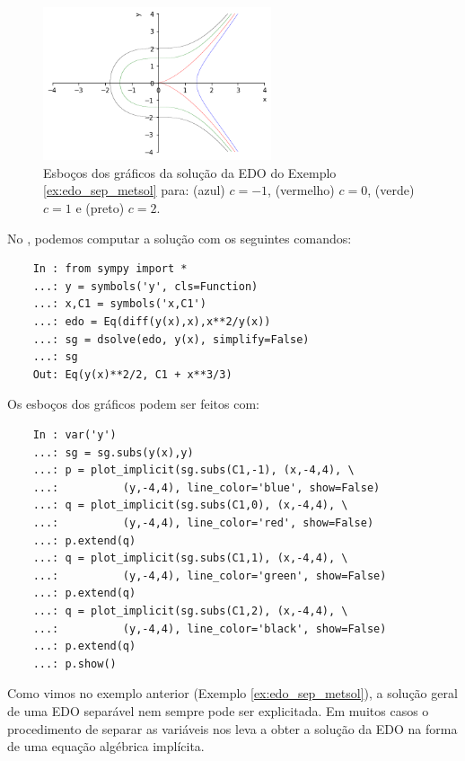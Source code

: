 \begin{ex}
  \begin{figure}[H]
    \centering
    \includegraphics[width=0.6\textwidth]{cap_edo1ordem/dados/fig_ex_edo_sep_metsol/fig_ex_edo_sep_metsol}
    \caption{Esboços dos gráficos da solução da EDO do Exemplo \ref{ex:edo_sep_metsol} para: (azul) $c=-1$, (vermelho) $c=0$, (verde) $c=1$ e (preto) $c=2$.}
    \label{fig:ex_edo_sep_metsol}
  \end{figure}

  \ifispython
  No \python, podemos computar a solução com os seguintes comandos:
  \begin{lstlisting}
    In : from sympy import *
    ...: y = symbols('y', cls=Function)
    ...: x,C1 = symbols('x,C1')
    ...: edo = Eq(diff(y(x),x),x**2/y(x))
    ...: sg = dsolve(edo, y(x), simplify=False)
    ...: sg
    Out: Eq(y(x)**2/2, C1 + x**3/3)
  \end{lstlisting}
  Os esboços dos gráficos podem ser feitos com:
  \begin{lstlisting}
    In : var('y')
    ...: sg = sg.subs(y(x),y)
    ...: p = plot_implicit(sg.subs(C1,-1), (x,-4,4), \
    ...:          (y,-4,4), line_color='blue', show=False)
    ...: q = plot_implicit(sg.subs(C1,0), (x,-4,4), \
    ...:          (y,-4,4), line_color='red', show=False)
    ...: p.extend(q)
    ...: q = plot_implicit(sg.subs(C1,1), (x,-4,4), \
    ...:          (y,-4,4), line_color='green', show=False)
    ...: p.extend(q)
    ...: q = plot_implicit(sg.subs(C1,2), (x,-4,4), \
    ...:          (y,-4,4), line_color='black', show=False)
    ...: p.extend(q)
    ...: p.show()
  \end{lstlisting}
  \fi

\end{ex}

\begin{obs}
  Como vimos no exemplo anterior (Exemplo \ref{ex:edo_sep_metsol}), a solução geral de uma EDO separável nem sempre pode ser explicitada. Em muitos casos o procedimento de separar as variáveis nos leva a obter a solução da EDO na forma de uma equação algébrica implícita.
\end{obs}

